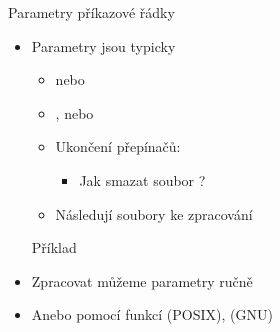 \begin{frame}{Parametry příkazové řádky}

  \begin{itemize}
    \item Parametry jsou typicky
    \begin{itemize}
      \item {} nebo 
      \item {},  nebo

      \pause

      \item Ukončení přepínačů: \cmd{\--}
      \begin{itemize}
	\item Jak smazat soubor ?
      \end{itemize}

      \pause

      \item Následují soubory ke zpracování
    \end{itemize}

    \pause

    \begin{block}{Příklad}
    \end{block}

    \pause

    \item Zpracovat můžeme parametry ručně

    \pause

    \item Anebo pomocí funkcí  (POSIX),  (GNU)
  \end{itemize}

\end{frame}

